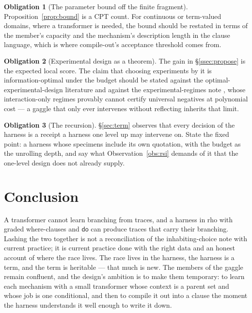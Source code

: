 \documentclass[11pt]{article}
\theoremstyle{plain}
\theoremstyle{definition}
\newtheorem{obligation}{Obligation}
\theoremstyle{remark}
\newcommand{\dok}{\textsf{do}}
\begin{document}
\begin{obligation}[The parameter bound off the finite fragment]
Proposition~\ref{prop:bound} is a CPT count. For continuous or term-valued
domains, where a transformer is needed, the bound should be restated in terms
of the member's capacity and the mechanism's description length in the clause
language, which is where compile-out's acceptance threshold comes from.
\end{obligation}

\begin{obligation}[Experimental design as a theorem]
The gain in \S\ref{ssec:propose} is the expected local score. The claim that
choosing experiments by it is information-optimal under the budget should be
stated against the optimal-experimental-design literature and against the
experimental-regimes note \cite{ExpRegimes}, whose interaction-only regimes
provably cannot certify universal negatives at polynomial cost --- a gaggle that
only ever intervenes without reflecting inherits that limit.
\end{obligation}

\begin{obligation}[The recursion]
\S\ref{sec:term} observes that every decision of the harness is a receipt a
harness one level up may intervene on. State the fixed point: a harness whose
specimens include its own quotation, with the budget as the unrolling depth, and
say what Observation~\ref{obs:rsi} demands of it that the one-level design does
not already supply.
\end{obligation}

\section{Conclusion}

A transformer cannot learn branching from traces, and a harness in rho with
graded where-clauses and $\dok$ can produce traces that carry their branching.
Lashing the two together is not a reconciliation of the inhabiting-choice note
with current practice; it is current practice done with the right data and an
honest account of where the race lives. The race lives in the harness, the
harness is a term, and the term is heritable --- that much is new. The members
of the gaggle remain confluent, and the design's ambition is to make them
temporary: to learn each mechanism with a small transformer whose context is a
parent set and whose job is one conditional, and then to compile it out into a
clause the moment the harness understands it well enough to write it down.
\end{document}
